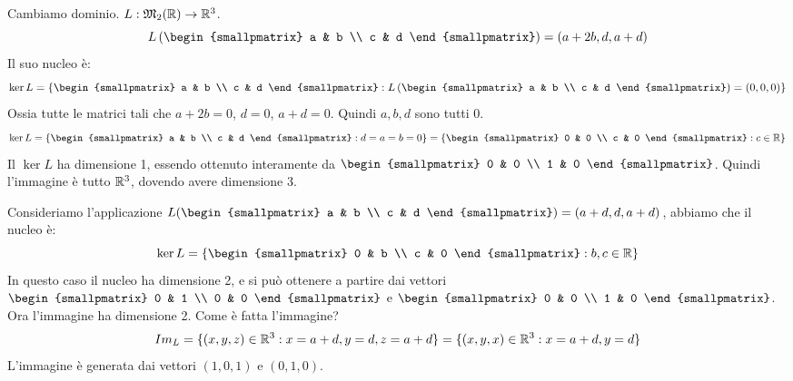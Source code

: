 \begin{exmp}
Cambiamo dominio. $L : \mathfrak{M}_2 (\mathbb{R}) \to \mathbb{R}^3$.
\[
L \left( 
\begin{smallpmatrix}
a & b \\
c & d
\end{smallpmatrix}
\right) = ( a + 2b, d, a +d)
\]
Il suo nucleo \`e:
\[
\ker L = \{ 
\begin{smallpmatrix}
a & b \\
c & d
\end{smallpmatrix}
: L \left(
\begin{smallpmatrix}
a & b \\
c & d
\end{smallpmatrix}
\right) = (0, 0, 0) \}
\]
Ossia tutte le matrici tali che $a + 2b = 0$, $d = 0$, $a + d = 0$. Quindi $a, b, d$ sono tutti 0.
\[
\ker L = \left\{ 
\begin{smallpmatrix}
a & b \\
c & d
\end{smallpmatrix}
: d = a = b = 0 \right\} = \left\{ 
\begin{smallpmatrix}
0 & 0 \\
c & 0
\end{smallpmatrix}
: c \in \reals \right\}
\]
Il $\ker L$ ha dimensione 1, essendo ottenuto interamente da $\begin{smallpmatrix} 0 & 0 \\ 1 & 0 \end{smallpmatrix}$. Quindi l'immagine \`e tutto $\mathbb{R}^3$, dovendo avere dimensione 3.

Consideriamo l'applicazione $L( \begin{smallpmatrix} a & b \\ c & d \end{smallpmatrix} ) = (a + d, d, a +d)$, abbiamo che il nucleo \`e:
\[
\ker L = \left\{
\begin{smallpmatrix}
0 & b \\
c & 0
\end{smallpmatrix}
: b, c \in \reals \right\}
\]
In questo caso il nucleo ha dimensione 2, e si pu\`o ottenere a partire dai vettori $\begin{smallpmatrix} 0 & 1 \\ 0 & 0 \end{smallpmatrix}$ e $\begin{smallpmatrix} 0 & 0 \\ 1 & 0 \end{smallpmatrix}$. Ora l'immagine ha dimensione 2. Come \`e fatta l'immagine?
\[
Im_{L} = \{ (x, y, z) \in \mathbb{R}^3 : x = a + d, y = d, z = a + d \} = 
\{ (x, y, x) \in \mathbb{R}^3 : x = a + d, y = d \}
\]
L'immagine \`e generata dai vettori $(1,0,1)$ e $(0,1,0)$.
\end{exmp}

